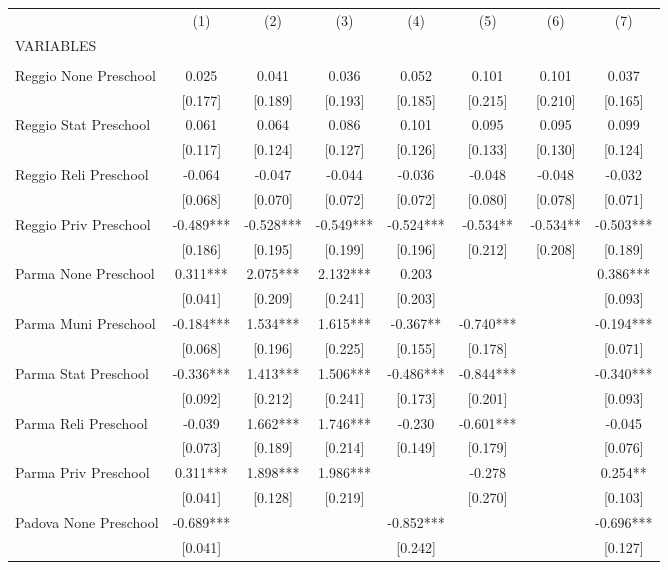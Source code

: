 \begin{tabular}{lccccccc} \hline
 & (1) & (2) & (3) & (4) & (5) & (6) & (7) \\
VARIABLES &  &  &  &  &  &  &  \\ \hline
 &  &  &  &  &  &  &  \\
Reggio None Preschool & 0.025 & 0.041 & 0.036 & 0.052 & 0.101 & 0.101 & 0.037 \\
 & [0.177] & [0.189] & [0.193] & [0.185] & [0.215] & [0.210] & [0.165] \\
Reggio Stat Preschool & 0.061 & 0.064 & 0.086 & 0.101 & 0.095 & 0.095 & 0.099 \\
 & [0.117] & [0.124] & [0.127] & [0.126] & [0.133] & [0.130] & [0.124] \\
Reggio Reli Preschool & -0.064 & -0.047 & -0.044 & -0.036 & -0.048 & -0.048 & -0.032 \\
 & [0.068] & [0.070] & [0.072] & [0.072] & [0.080] & [0.078] & [0.071] \\
Reggio Priv Preschool & -0.489*** & -0.528*** & -0.549*** & -0.524*** & -0.534** & -0.534** & -0.503*** \\
 & [0.186] & [0.195] & [0.199] & [0.196] & [0.212] & [0.208] & [0.189] \\
Parma None Preschool & 0.311*** & 2.075*** & 2.132*** & 0.203 &  &  & 0.386*** \\
 & [0.041] & [0.209] & [0.241] & [0.203] &  &  & [0.093] \\
Parma Muni Preschool & -0.184*** & 1.534*** & 1.615*** & -0.367** & -0.740*** &  & -0.194*** \\
 & [0.068] & [0.196] & [0.225] & [0.155] & [0.178] &  & [0.071] \\
Parma Stat Preschool & -0.336*** & 1.413*** & 1.506*** & -0.486*** & -0.844*** &  & -0.340*** \\
 & [0.092] & [0.212] & [0.241] & [0.173] & [0.201] &  & [0.093] \\
Parma Reli Preschool & -0.039 & 1.662*** & 1.746*** & -0.230 & -0.601*** &  & -0.045 \\
 & [0.073] & [0.189] & [0.214] & [0.149] & [0.179] &  & [0.076] \\
Parma Priv Preschool & 0.311*** & 1.898*** & 1.986*** &  & -0.278 &  & 0.254** \\
 & [0.041] & [0.128] & [0.219] &  & [0.270] &  & [0.103] \\
Padova None Preschool & -0.689*** &  &  & -0.852*** &  &  & -0.696*** \\
 & [0.041] &  &  & [0.242] &  &  & [0.127] \\

\end{tabular}
